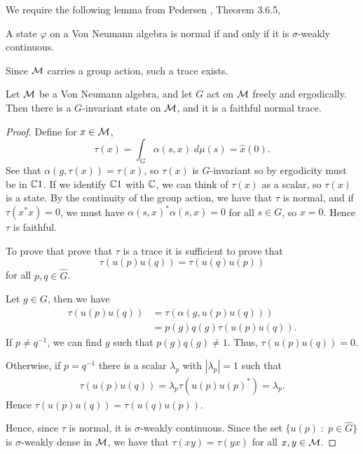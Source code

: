 We require the following lemma from Pedersen \cite{pedersen},
Theorem 3.6.5,
\begin{lemma}
    A state $\varphi$ on a Von Neumann algebra is normal if and only if it is
    $\sigma$-weakly continuous.
\end{lemma}


Since $\mathcal{M}$ carries a group action, such a trace exists.
\begin{lemma}
    Let $\mathcal{M}$ be a Von Neumann algebra, and let $G$ act on $\mathcal{M}$ freely and ergodically.
    Then there is a $G$-invariant state on $\mathcal{M}$, and it is a faithful normal
    trace.
\end{lemma}
\begin{proof}
    Define for $x \in \mathcal{M}$, 
    \begin{equation}
        \tau(x) = \int_G \alpha(s,x)\;d\mu(s) = \hat{x}(0).
    \end{equation}
    See that $\alpha(g,\tau(x)) = \tau(x)$, so $\tau(x)$
    is $G$-invariant so by ergodicity must be in $\mathbb{C} 1$. If we identify
    $\mathbb{C} 1$ with $\mathbb{C}$, we can think of $\tau(x)$ as a scalar, so $\tau(x)$
    is a state. By the continuity of the group action, we have that $\tau$ is normal,
    and if $\tau(x^*x) = 0$, we must have $\alpha(s,x)^*\alpha(s,x) = 0$
    for all $s \in G$, so $x = 0$. Hence $\tau$ is faithful.
    
    To prove that prove that $\tau$ is a trace it is sufficient to prove that
    \begin{equation}
        \tau(u(p)u(q)) = \tau(u(q)u(p))
    \end{equation}
    for all $p,q \in \widehat{G}$. 
    
    Let $g \in G$, then we have
    \begin{align}
        \tau(u(p)u(q)) &= \tau(\alpha(g,u(p)u(q)))\\
        &= p(g)q(g)\tau(u(p)u(q)).
    \end{align}
    If $p \neq q^{-1}$, we can find $g$ such that $p(g)q(g) \neq 1$. Thus,
    $\tau(u(p)u(q)) = 0$.
    
    Otherwise, if $p = q^{-1}$ there is a scalar $\lambda_p$
    with $|\lambda_p| = 1$ such that
    \begin{align}
        \tau(u(p)u(q)) = \lambda_p\tau(u(p)u(p)^*) = \lambda_p.
    \end{align}
    Hence $\tau(u(p)u(q)) = \tau(u(q)u(p))$.
    
    Hence, since $\tau$ is normal, it is $\sigma$-weakly continuous.
    Since the set $\{u(p)\;:\;p \in \widehat{G}\}$ is $\sigma$-weakly
    dense in $\mathcal{M}$, we have that $\tau(xy) = \tau(yx)$ for all $x,y \in \mathcal{M}$.
    
\end{proof} 


